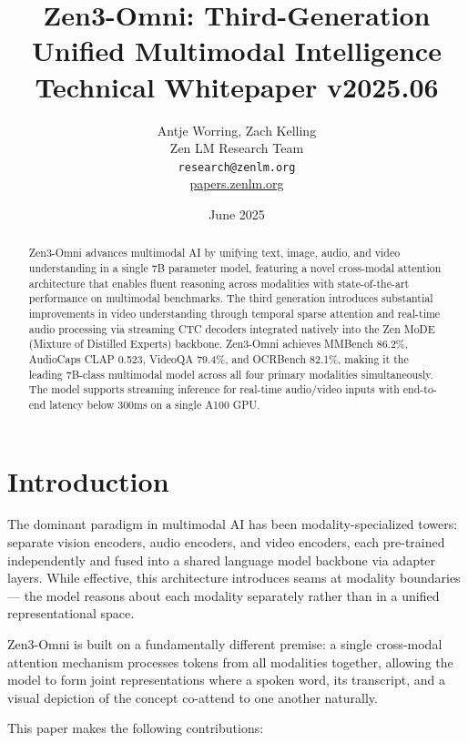 \documentclass[11pt,a4paper]{article}
\title{\textbf{Zen3-Omni: Third-Generation Unified Multimodal Intelligence}\\
\large Technical Whitepaper v2025.06}
\author{Antje Worring, Zach Kelling \\ Zen LM Research Team\\
\texttt{research@zenlm.org}\\
\href{https://papers.zenlm.org}{papers.zenlm.org}}
\date{June 2025}
\begin{document}
\maketitle

\begin{abstract}
Zen3-Omni advances multimodal AI by unifying text, image, audio, and video understanding
in a single 7B parameter model, featuring a novel cross-modal attention architecture that
enables fluent reasoning across modalities with state-of-the-art performance on multimodal
benchmarks. The third generation introduces substantial improvements in video understanding
through temporal sparse attention and real-time audio processing via streaming CTC decoders
integrated natively into the Zen MoDE (Mixture of Distilled Experts) backbone. Zen3-Omni
achieves MMBench 86.2\%, AudioCaps CLAP 0.523, VideoQA 79.4\%, and OCRBench 82.1\%,
making it the leading 7B-class multimodal model across all four primary modalities
simultaneously. The model supports streaming inference for real-time audio/video inputs
with end-to-end latency below 300ms on a single A100 GPU.
\end{abstract}

\tableofcontents
\newpage

\section{Introduction}
\label{sec:intro}

The dominant paradigm in multimodal AI has been modality-specialized towers: separate
vision encoders, audio encoders, and video encoders, each pre-trained independently and
fused into a shared language model backbone via adapter layers. While effective, this
architecture introduces seams at modality boundaries --- the model reasons about each
modality separately rather than in a unified representational space.

Zen3-Omni is built on a fundamentally different premise: a single cross-modal attention
mechanism processes tokens from all modalities together, allowing the model to form
joint representations where a spoken word, its transcript, and a visual depiction of the
concept co-attend to one another naturally.

This paper makes the following contributions:
\end{document}
